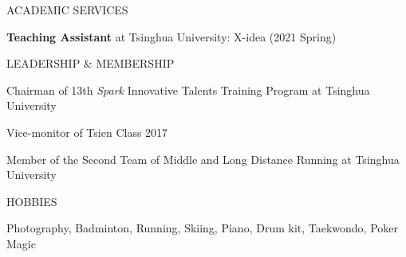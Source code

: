 \documentclass{resume} %
\begin{document}
	\begin{rSection}{ACADEMIC SERVICES}
		\item \textbf{Teaching Assistant} at Tsinghua University: X-idea (2021 Spring)
	\end{rSection}

	\begin{rSection}{LEADERSHIP \& MEMBERSHIP}
		\item Chairman of 13th \textsl{Spark} Innovative Talents Training Program at Tsinghua University
		\item Vice-monitor of Tsien Class 2017
		\item Member of the Second Team of Middle and Long Distance Running at Tsinghua University
	\end{rSection}

	\begin{rSection}{HOBBIES}
		\item Photography, Badminton, Running, Skiing, Piano, Drum kit, Taekwondo, Poker Magic
	\end{rSection}
	
\end{document}

